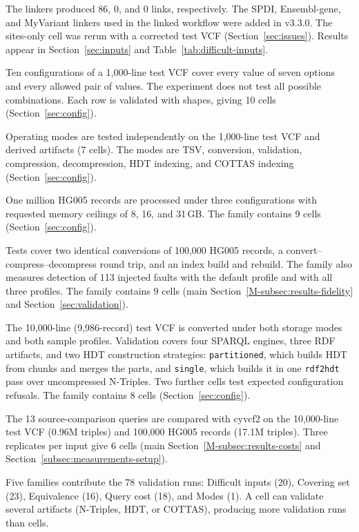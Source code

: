 \documentclass[11pt]{article}
\begin{document}
\begin{description}
The linkers produced 86, 0, and 0 links, respectively.
The SPDI, Ensembl-gene, and MyVariant linkers used in the linked workflow were added in v3.3.0.
The sites-only cell was rerun with a corrected test VCF (Section~\ref{sec:issues}).
Results appear in Section~\ref{sec:inputs} and Table~\ref{tab:difficult-inputs}.
\item[Covering set (\texttt{11}).]
Ten configurations of a 1,000-line test VCF cover every value of seven options and every allowed pair of values.
The experiment does not test all possible combinations.
Each row is validated with shapes, giving 10 cells (Section~\ref{sec:config}).
\item[Modes (\texttt{12}).]
Operating modes are tested independently on the 1,000-line test VCF and derived artifacts (7 cells).
The modes are TSV, conversion, validation, compression, decompression, HDT indexing, and COTTAS indexing (Section~\ref{sec:config}).
\item[Feasibility (\texttt{10}).]
One million HG005 records are processed under three configurations with requested memory ceilings of 8, 16, and 31\,GB.
The family contains 9 cells (Section~\ref{sec:config}).
\item[Robustness (\texttt{08}).]
Tests cover two identical conversions of 100,000 HG005 records, a convert--compress--decompress round trip, and an index build and rebuild.
The family also measures detection of 113 injected faults with the default profile and with all three profiles.
The family contains 9 cells (main Section~\ref{M-subsec:results-fidelity} and Section~\ref{sec:validation}).
\item[Equivalence (\texttt{06}).]
The 10,000-line (9,986-record) test VCF is converted under both storage modes and both sample profiles.
Validation covers four SPARQL engines, three RDF artifacts, and two HDT construction strategies: \texttt{partitioned}, which builds HDT from chunks and merges the parts, and \texttt{single}, which builds it in one \texttt{rdf2hdt} pass over uncompressed N-Triples.
Two further cells test expected configuration refusals.
The family contains 8 cells (Section~\ref{sec:config}).
\item[Query cost (\texttt{13}).]
The 13 source-comparison queries are compared with cyvcf2 on the 10,000-line test VCF (0.96M triples) and 100,000 HG005 records (17.1M triples).
Three replicates per input give 6 cells (main Section~\ref{M-subsec:results-costs} and Section~\ref{subsec:measurements-setup}).
\end{description}
Five families contribute the 78 validation runs: Difficult inputs (20), Covering set (23), Equivalence (16), Query cost (18), and Modes (1).
A cell can validate several artifacts (N-Triples, HDT, or COTTAS), producing more validation runs than cells.
\end{document}
